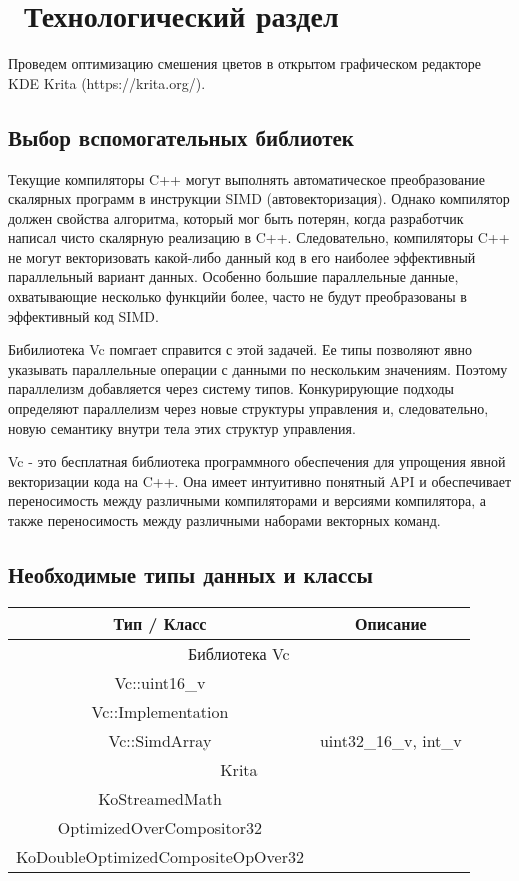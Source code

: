 \chapter{ Технологический раздел}
\label{cha:design}

Проведем оптимизацию смешения цветов в открытом графическом редакторе KDE Krita (https://krita.org/). 


\section{Выбор вспомогательных библиотек}
Текущие компиляторы C++ могут выполнять автоматическое преобразование скалярных программ в инструкции SIMD (автовекторизация). Однако компилятор должен свойства алгоритма, который мог быть потерян, когда разработчик написал чисто скалярную реализацию в C++. Следовательно, компиляторы C++ не могут векторизовать какой-либо данный код в его наиболее эффективный параллельный вариант данных. Особенно большие параллельные данные, охватывающие несколько функцийи более, часто не будут преобразованы в эффективный код SIMD.

Бибилиотека Vc помгает справится с этой задачей. Ее типы позволяют явно указывать параллельные операции с данными по нескольким значениям. Поэтому параллелизм добавляется через систему типов. Конкурирующие подходы определяют параллелизм через новые структуры управления и, следовательно, новую семантику внутри тела этих структур управления.

Vc - это бесплатная библиотека программного обеспечения для упрощения явной векторизации кода на C++. Она имеет интуитивно понятный API и обеспечивает переносимость между различными компиляторами и версиями компилятора, а также переносимость между различными наборами векторных команд. 
\cite{bib8}


\section{Необходимые типы данных и классы}

\begin{table}[h!]
	\begin{center}
		\begin{tabular}{|c|c|}
			\hline
			Тип / Класс& Описание \\
			\hline
			\multicolumn{2}{|c|}{Библиотека Vc} \\
			\hline
			Vc::uint16\_v &  \\
		   Vc::Implementation &  \\
			Vc::SimdArray & uint32\_16\_v, int\_v\\
			\hline
			\multicolumn{2}{|c|}{Krita} \\
			\hline
			KoStreamedMath& \\
			OptimizedOverCompositor32 &  \\
			 KoDoubleOptimizedCompositeOpOver32 &  \\
			\hline
		\end{tabular}
	\end{center}
\end{table} 

